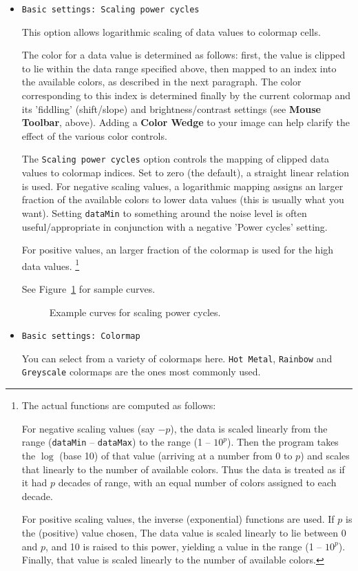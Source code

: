 \begin{itemize}
\item {\tt Basic settings: Scaling power cycles}

This option allows logarithmic scaling of data values to colormap cells.  

The color for a data value is determined as follows: first, the value
is clipped to lie within the data range specified above, then mapped
to an index into the available colors, as described in the next
paragraph. The color corresponding to this index is determined finally
by the current colormap and its 'fiddling' (shift/slope) and
brightness/contrast settings (see {\bf Mouse Toolbar}, above).  Adding
a {\bf Color Wedge} to your image can help clarify the effect of the
various color controls.

The {\tt Scaling power cycles} option controls the mapping of clipped data
values to colormap indices.  Set to zero (the default), a straight linear
relation is used.  For negative scaling values, a logarithmic mapping
assigns an larger fraction of the available colors to lower data values (this
is usually what you want). Setting {\tt dataMin} 
to something around the noise level
is often useful/appropriate in conjunction with a negative 'Power cycles'
setting. 

For positive values, an larger fraction of the colormap is used for the high
data values.
\footnote{The actual functions are computed as follows:

For negative scaling values (say $-p$), the data is scaled linearly
from the range ({\tt dataMin} -- {\tt dataMax}) to the range (1 -- $10^{p}$).
Then the program takes the $\log$ (base 10) of that value (arriving at
a number from 0 to $p$) and scales that linearly to the number of
available colors.  Thus the data is treated as if it had $p$ decades
of range, with an equal number of colors assigned to each decade.

For positive scaling values, the inverse (exponential) functions are used.
If $p$ is the (positive) value chosen,  The data value is scaled linearly to
lie between 0 and $p$, and 10 is raised to this power, yielding a value in the
range (1 -- $10^{p}$).  Finally, that value is scaled linearly to the number
of available colors.}

See Figure~\ref{fig:scalingpower} for sample curves.
\begin{figure}[h]
\begin{center}
\caption{\label{fig:scalingpower} Example curves for scaling power cycles.}
\hrulefill
\end{center}
\end{figure}

\item {\tt Basic settings: Colormap}

You can select from a variety of colormaps here.  {\tt Hot Metal},
{\tt Rainbow} and {\tt Greyscale} colormaps are the ones most commonly used.

\end{itemize}


